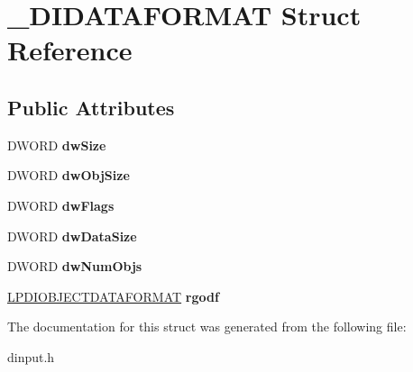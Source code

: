 \hypertarget{struct___d_i_d_a_t_a_f_o_r_m_a_t}{\section{\-\_\-\-D\-I\-D\-A\-T\-A\-F\-O\-R\-M\-A\-T Struct Reference}
\label{struct___d_i_d_a_t_a_f_o_r_m_a_t}
}
\subsection*{Public Attributes}
\begin{DoxyCompactItemize}
\item 
\hypertarget{struct___d_i_d_a_t_a_f_o_r_m_a_t_a64bed8771b6a51a293167bfb51f098e6}{D\-W\-O\-R\-D {\bfseries dw\-Size}}\label{struct___d_i_d_a_t_a_f_o_r_m_a_t_a64bed8771b6a51a293167bfb51f098e6}

\item 
\hypertarget{struct___d_i_d_a_t_a_f_o_r_m_a_t_a8eb1112dae047866b7d5a1db30a00f47}{D\-W\-O\-R\-D {\bfseries dw\-Obj\-Size}}\label{struct___d_i_d_a_t_a_f_o_r_m_a_t_a8eb1112dae047866b7d5a1db30a00f47}

\item 
\hypertarget{struct___d_i_d_a_t_a_f_o_r_m_a_t_a63ec17e89c54681dfae4dcf718c3271a}{D\-W\-O\-R\-D {\bfseries dw\-Flags}}\label{struct___d_i_d_a_t_a_f_o_r_m_a_t_a63ec17e89c54681dfae4dcf718c3271a}

\item 
\hypertarget{struct___d_i_d_a_t_a_f_o_r_m_a_t_ac802a619ba5d5c3ed68c7588de5d6695}{D\-W\-O\-R\-D {\bfseries dw\-Data\-Size}}\label{struct___d_i_d_a_t_a_f_o_r_m_a_t_ac802a619ba5d5c3ed68c7588de5d6695}

\item 
\hypertarget{struct___d_i_d_a_t_a_f_o_r_m_a_t_ace482429434def2c8661611324d27abf}{D\-W\-O\-R\-D {\bfseries dw\-Num\-Objs}}\label{struct___d_i_d_a_t_a_f_o_r_m_a_t_ace482429434def2c8661611324d27abf}

\item 
\hypertarget{struct___d_i_d_a_t_a_f_o_r_m_a_t_a184026e974a0d10632bd55e5fc2be20a}{\hyperlink{struct___d_i_o_b_j_e_c_t_d_a_t_a_f_o_r_m_a_t}{L\-P\-D\-I\-O\-B\-J\-E\-C\-T\-D\-A\-T\-A\-F\-O\-R\-M\-A\-T} {\bfseries rgodf}}\label{struct___d_i_d_a_t_a_f_o_r_m_a_t_a184026e974a0d10632bd55e5fc2be20a}

\end{DoxyCompactItemize}


The documentation for this struct was generated from the following file\-:\begin{DoxyCompactItemize}
\item 
dinput.\-h\end{DoxyCompactItemize}
